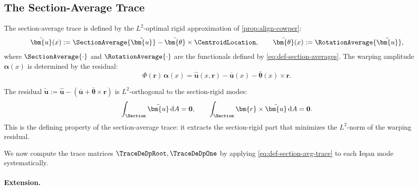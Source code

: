 \subsection{The Section-Average Trace}\label{sec:trace-cowper0}

The section-average trace is defined by the $L^2$-optimal rigid approximation 
of \cref{prop:align-cowper}:
\begin{equation}
\bar{\bm{u}}(x) := \SectionAverage{\hat{\bm{u}}} - \bar{\bm{\theta}} \times \CentroidLocation, 
\qquad 
\bar{\bm{\theta}}(x) := \RotationAverage{\hat{\bm{u}}},
\end{equation}
where \(\SectionAverage{\cdot}\) and \(\RotationAverage{\cdot}\) are the functionals defined by \eqref{eq:def-section-averages}. 
The warping amplitude $\bm{\alpha}(x)$ is determined by the residual:
\begin{equation}
\Phi(\bm{r})\,\bm{\alpha}(x) = \hat{\bm{u}}(x,\bm{r}) - \bar{\bm{u}}(x) - \bar{\bm{\theta}}(x) \times \bm{r}.
\end{equation}

\begin{remark}
The residual $\tilde{\bm{u}} := \hat{\bm{u}} - (\bar{\bm{u}} + \bar{\bm{\theta}} \times \bm{r})$ 
is $L^2$-orthogonal to the section-rigid modes:
\begin{equation*}
\int_{\Section} \tilde{\bm{u}} \, \mathrm{d}A = \mathbf{0}, 
\qquad 
\int_{\Section} \bm{r} \times \tilde{\bm{u}} \, \mathrm{d}A = \mathbf{0}.
\end{equation*}
This is the defining property of the section-average trace: it extracts the 
section-rigid part that minimizes the $L^2$-norm of the warping residual.
\end{remark}

We now compute the trace matrices $\TraceDeDpRoot, \TraceDeDpOne$ by 
applying \eqref{eq:def-section-avg-trace} to each Ieşan mode systematically. 

\paragraph{Extension.}

